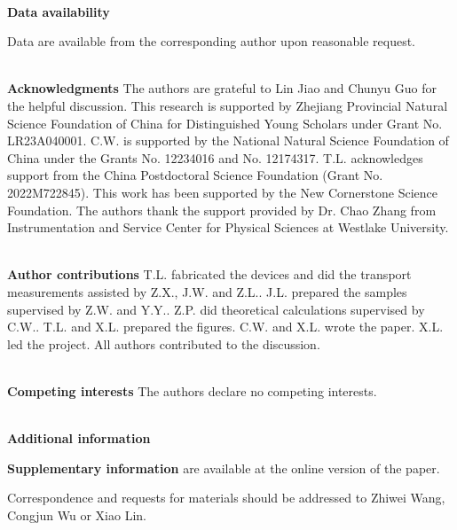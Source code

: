 \documentclass[article,reprint,amsmath,amssymb,superscriptaddress,longbibliography]{revtex4-1}
\begin{document}
~\\
\noindent\textbf{Data availability}

\noindent Data are available from the corresponding author upon reasonable request.


~\\
\small
\noindent\textbf{Acknowledgments}
The authors are grateful to Lin Jiao and Chunyu Guo for the helpful discussion.  
This research is supported by Zhejiang Provincial Natural Science Foundation of China for Distinguished Young Scholars under Grant No. LR23A040001. C.W. is supported by the National Natural Science Foundation of China under the Grants No. 12234016 and No. 12174317. T.L. acknowledges support from the China Postdoctoral Science Foundation (Grant No. 2022M722845). This work has been supported by the New Cornerstone Science Foundation. The authors thank the support provided by Dr. Chao Zhang from Instrumentation and Service Center for Physical Sciences at Westlake University.


~\\
\noindent\textbf{Author contributions}
T.L. fabricated the devices and did the transport measurements assisted by Z.X., J.W. and Z.L.. J.L. prepared the samples supervised by Z.W. and Y.Y.. Z.P. did theoretical calculations supervised by C.W.. T.L. and X.L. prepared the figures. C.W. and X.L. wrote the paper. X.L. led the project.  All authors contributed to the discussion.


~\\
\noindent\textbf{Competing interests}
The authors declare no competing interests.

~\\
\noindent\textbf{Additional information}

\noindent\textbf{Supplementary information} are available at the online version of the paper. 

\noindent Correspondence and requests for materials should be addressed to Zhiwei Wang, Congjun Wu or Xiao Lin.




\end{document}
